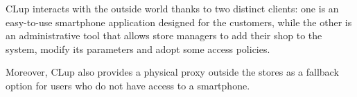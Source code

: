 \documentclass[a4paper,oneside,11pt]{book}   %
\begin{document}
    CLup interacts with the outside world thanks to two distinct clients: one is an easy-to-use smartphone application designed for the customers, while the other is an administrative tool that allows store managers to add their shop to the system, modify its parameters and adopt some access policies.
    
    Moreover, CLup also provides a physical proxy outside the stores as a fallback option for users who do not have access to a smartphone.
    
\newpage


\tableofcontents
\end{document}
